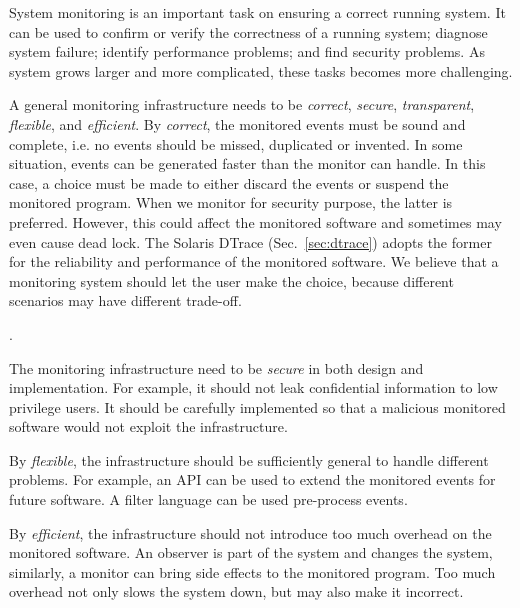 
System monitoring is an important task on ensuring a correct running
system.
It can be used to confirm or verify the correctness of a running system;
diagnose system failure;
identify performance problems;
and find security problems.
As system grows larger and more complicated, these tasks becomes more challenging.

A general monitoring infrastructure needs to be
{\em correct}, {\em secure}, {\em transparent}, {\em flexible}, and {\em efficient}.
By {\em correct}, the monitored events must be sound and complete, i.e.
no events should be missed, duplicated or invented.
In some situation, events can be generated faster than the monitor can handle.
In this case, a choice must be made to either discard the events
or suspend the monitored program.
When we monitor for security purpose, the latter is preferred.
However, this could affect the monitored software and sometimes may even
cause dead lock.
The Solaris DTrace (Sec.~\ref{sec:dtrace}) adopts the former for the
reliability and performance of the monitored software.
We believe that a monitoring system should let the user make the choice,
because different scenarios may have different trade-off.

.

The monitoring infrastructure need to be {\em secure} in both design and implementation.
For example, it should not leak confidential information to low privilege users.
It should be carefully implemented so that a malicious monitored
software would not exploit the infrastructure.


By {\em flexible}, the infrastructure should be sufficiently general to
handle different problems.
For example, an API can be used to extend the monitored events for future software.
A filter language can be used pre-process events.

By {\em efficient}, the infrastructure should not introduce too much
overhead on the monitored software.
An observer is part of the system and changes the system, similarly,
a monitor can bring side effects to the monitored program.
Too much overhead not only slows the system down, but may also make
it incorrect.

